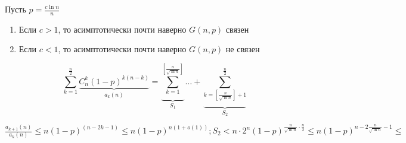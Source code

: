 
\begin{reminder}
Пусть \(p = \frac{c \ln{n}}{n}\)
\begin{enumerate}
  \item Если \(c > 1\), то асимптотически почти наверно \(G(n, p)\) связен
  \item Если \(c < 1\), то асимптотически почти наверно \(G(n, p)\) не связен
\end{enumerate}
\end{reminder}

\[\sum_{k=1}^\frac{n}{2} \underbrace{C_n^k (1-p)^{k(n-k)}}_{a_k(n)} = \underbrace{\sum_{k=1}^{[\frac{n}{\sqrt{\ln{n}}}]}}_{S_1} \dots + \underbrace{\sum_{k = [\frac{n}{\sqrt{\ln{n}}}] + 1}^{\frac{n}{2}}}_{S_2}\]

\(\frac{a_{k+1}(n)}{a_k(n)} \le n (1-p)^{(n-2k-1)} \le n(1-p)^{n(1 + o(1))}; S_2 < n \cdot 2^n (1 - p)^{\frac{n}{\sqrt{\ln{n}}} \cdot \frac{n}{2}} \le n(1 - p)^{n - 2\frac{n}{\sqrt{\ln{n}}} - 1}  \le \)